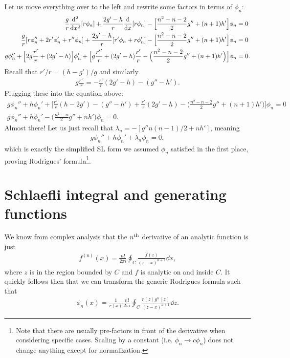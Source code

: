 Let us move everything over to the left and rewrite some factors in terms of $\phi_{n}$:
\begin{align}
    \frac{g}{r} \dv[2]{x} [r\phi_{n}] + \frac{2g' - h}{r} \dv{x} [r\phi_{n}] - \Big[ \frac{n^2-n-2}{2} g'' + (n+1) h' \Big] \phi_{n} &= 0 \nonumber \\
    \frac{g}{r} [ r\phi_{n}'' + 2r'\phi_{n}' + r'' \phi_{n} ] + \frac{2g' - h}{r} [ r'\phi_{n} + r\phi_{n}' ] - \Big[ \frac{n^2 - n - 2}{2} g'' + (n+1) h' \Big] \phi_{n} &= 0 \nonumber \\
    g \phi_{n}'' + \Big[ 2 g \frac{r'}{r} + (2g'-h) \Big] \phi_{n}' + \Big[ g \frac{r''}{r} + (2g' - h) \frac{r'}{r} - \Big( \frac{n^2 - n - 2}{2} g'' + (n+1)h' \Big) \Big] \phi_{n} &= 0
.\end{align}
Recall that $r'/r = (h - g')/g$ and similarly
\begin{eqnarray}
    g\frac{r''}{r} = -\frac{r'}{r} (2g' - h) - (g'' - h')
.\end{eqnarray}
Plugging these into the equation above:
\begin{gather}
    g \phi_{n}'' + h \phi_{n}' + \Big[ \frac{r'}{r}(h - 2g') - (g'' - h') + \frac{r'}{r}(2g' - h) - \Big( \frac{n^2 - n - 2}{2} g'' + (n+1)h' \Big) \Big] \phi_{n} = 0 \nonumber \\
    g \phi_{n}'' + h\phi_{n}' - \Big( \frac{n^2 - n}{2} g'' + n h' \Big) \phi_{n} = 0
.\end{gather}
Almost there!
Let us just recall that $\lambda_{n} = -[ g'' n(n-1)/2 + n h']$, meaning
\begin{eqnarray}
    g \phi_{n}'' + h \phi_{n}' + \lambda_{n} \phi_{n} = 0
,\end{eqnarray}
which is exactly the simplified SL form we assumed $\phi_{n}$ satisfied in the first place, proving Rodrigues' formula\footnote{Note that there are usually pre-factors in front of the derivative when considering specific cases. Scaling by a constant (i.e. $\phi_{n} \rightarrow c \phi_{n}$) does not change anything except for normalization.}.


\section{Schlaefli integral and generating functions}

We know from complex analysis that the $n^{\rm th}$ derivative of an analytic function is just
\begin{eqnarray}
    f^{(n)}(x) = \frac{n!}{2 \pi i} \oint_{C} \frac{f(z)}{(z - x)^{n+1}} \dd{x}
,\end{eqnarray}
where $z$ is in the region bounded by $C$ and $f$ is analytic on and inside $C$.
It quickly follows then that we can transform the generic Rodrigues formula such that
\begin{eqnarray}
    \phi_{n}(x) = \frac{1}{r(x)} \frac{n!}{2 \pi i} \oint_{C} \frac{r(z) g^{n}(z)}{(z - x)^{n+1}} \dd{z}
.\end{eqnarray}

